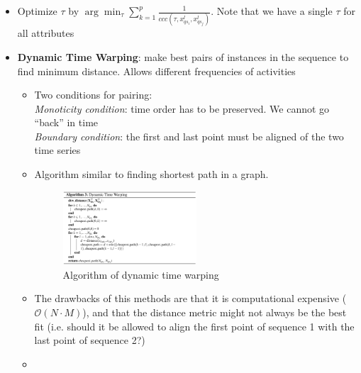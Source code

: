 \begin{itemize}
\begin{enumerate}
\begin{itemize}
			\item Optimize $\tau$ by $\arg\min_{\tau} \sum_{k=1}^{p} \frac{1}{ccc\left(\tau, x_{qs_i}^{l}, x_{qs_j}^{l}\right)}$. Note that we have a single $\tau$ for all attributes
			\item \textbf{Dynamic Time Warping}: make best pairs of instances in the sequence to find minimum distance. Allows different frequencies of activities
			\begin{itemize}
				\item Two conditions for pairing: \\
				\textit{Monoticity condition}: time order has to be preserved. We cannot go ``back'' in time\\
				\textit{Boundary condition}: the first and last point must be aligned of the two time series
				\item Algorithm similar to finding shortest path in a graph.
				\begin{figure}[ht!]
					\centering
					\includegraphics[width=0.5\textwidth]{figures/chapter_5_dynamic_time_warping.png}
					\caption{Algorithm of dynamic time warping}
				\end{figure}
				\item The drawbacks of this methods are that it is computational expensive ($\mathcal{O}(N\cdot M)$), and that the distance metric might not always be the best fit (i.e. should it be allowed to align the first point of sequence 1 with the last point of sequence 2?)
				\item {}
			\end{itemize}
		\end{itemize} 
	\end{enumerate}
\end{itemize}

